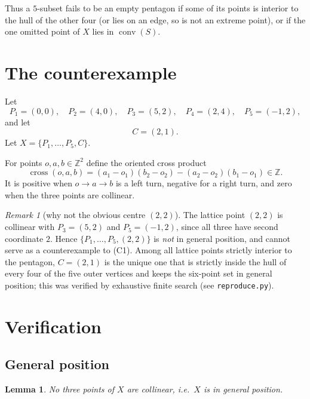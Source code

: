 \documentclass[11pt]{article}
\newtheorem{lemma}{Lemma}
\theoremstyle{remark}
\newtheorem{remark}{Remark}
\begin{document}
Thus a $5$-subset fails to be an empty pentagon if some of its points is
interior to the hull of the other four (or lies on an edge, so is not an
extreme point), or if the one omitted point of $X$ lies in
$\operatorname{conv}(S)$.

\section{The counterexample}

Let
\begin{equation}
P_1=(0,0),\quad P_2=(4,0),\quad P_3=(5,2),\quad P_4=(2,4),\quad P_5=(-1,2),
\end{equation}
and let
\begin{equation}
C=(2,1).
\end{equation}
Let $X=\{P_1,\dots,P_5,C\}$.

For points $o,a,b\in\mathbb{Z}^2$ define the oriented cross product
\begin{equation}
\operatorname{cross}(o,a,b)
  =(a_1-o_1)(b_2-o_2)-(a_2-o_2)(b_1-o_1)\in\mathbb{Z}.
\end{equation}
It is positive when $o\to a\to b$ is a left turn, negative for a right turn,
and zero when the three points are collinear.

\begin{remark}[why not the obvious centre $(2,2)$]
The lattice point $(2,2)$ is collinear with $P_3=(5,2)$ and $P_5=(-1,2)$,
since all three have second coordinate $2$.  Hence $\{P_1,\dots,P_5,(2,2)\}$
is \emph{not} in general position, and cannot serve as a counterexample to
(C1).  Among all lattice points strictly interior to the pentagon,
$C=(2,1)$ is the unique one that is strictly inside the hull of every four
of the five outer vertices and keeps the six-point set in general position;
this was verified by exhaustive finite search (see \texttt{reproduce.py}).
\end{remark}

\section{Verification}

\subsection{General position}

\begin{lemma}
No three points of $X$ are collinear, i.e.\ $X$ is in general position.
\end{lemma}
\end{document}
